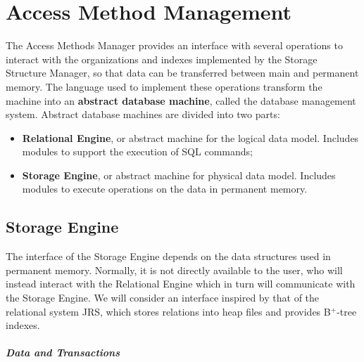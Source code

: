 \chapter{Access Method Management}

The Access Methods Manager provides an interface with several operations to interact with the organizations and indexes implemented by the Storage Structure Manager, so that data can be transferred between main and permanent memory. The language used to implement these operations transform the machine into an \textbf{abstract database machine}, called the database management system. Abstract database machines are divided into two parts:
\begin{itemize}
    \item \textbf{Relational Engine}, or abstract machine for the logical data model. Includes modules to support the execution of SQL commands;
    \item \textbf{Storage Engine}, or abstract machine for physical data model. Includes modules to execute operations on the data in permanent memory.
\end{itemize}

\section{Storage Engine}

The interface of the Storage Engine depends on the data structures used in permanent memory. Normally, it is not directly available to the user, who will instead interact with the Relational Engine which in turn will communicate with the Storage Engine. We will consider an interface inspired by that of the relational system JRS, which stores relations into heap files and provides B$^+$-tree indexes.

\paragraph{Data and Transactions}

